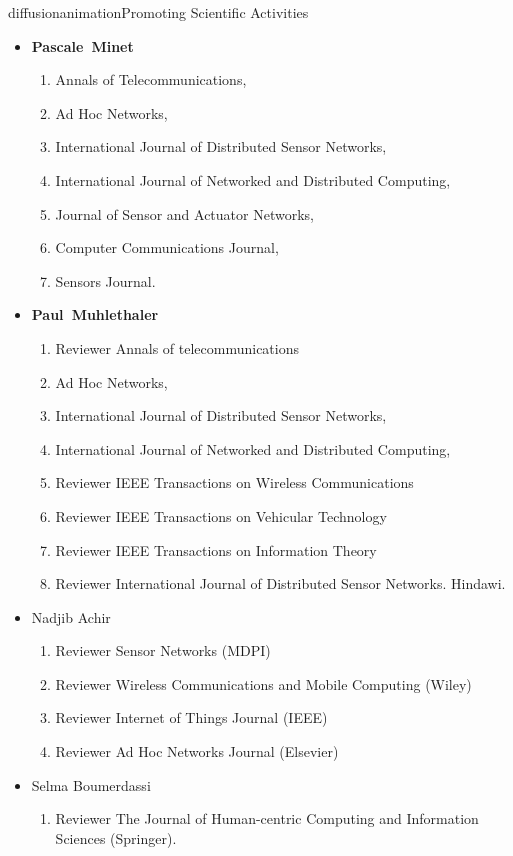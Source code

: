 \documentclass{ra2016}
\newcommand{\paul}             {\textbf{Paul~Muhlethaler}}
\newcommand{\pascale}          {\textbf{Pascale~Minet}}
\begin{document}
\begin{module}{diffusion}{animation}{Promoting Scientific Activities}
\begin{itemize}
    \item \pascale
        \begin{enumerate}
            \item Annals of Telecommunications,
            \item Ad Hoc Networks,
            \item International Journal of Distributed Sensor Networks,
            \item International Journal of Networked and Distributed Computing,
            \item Journal of Sensor and Actuator Networks,
            \item Computer Communications Journal,
            \item Sensors Journal.
        \end{enumerate}
    \item \paul
        \begin{enumerate}
            \item Reviewer Annals of telecommunications
            \item Ad Hoc Networks,
            \item International Journal of Distributed Sensor Networks,
            \item International Journal of Networked and Distributed Computing,
            \item Reviewer IEEE Transactions on Wireless Communications
            \item Reviewer IEEE Transactions on Vehicular Technology
            \item Reviewer IEEE Transactions on Information Theory
            \item Reviewer International Journal of Distributed Sensor Networks. Hindawi. 
        \end{enumerate}
    \item Nadjib Achir
        \begin{enumerate}
            \item Reviewer Sensor Networks (MDPI)
            \item Reviewer Wireless Communications and Mobile Computing (Wiley)
            \item Reviewer Internet of Things Journal (IEEE)
            \item Reviewer Ad Hoc Networks Journal (Elsevier)
        \end{enumerate}
     \item Selma Boumerdassi
        \begin{enumerate}
            \item Reviewer The Journal of Human-centric Computing and Information Sciences (Springer).
        \end{enumerate}
\end{itemize}


\end{module}
\end{document}
